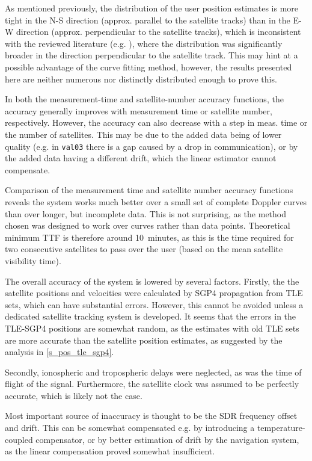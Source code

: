 As mentioned previously, the distribution of the user position estimates is more tight in the N-S direction (approx. parallel to the satellite tracks) than in the E-W direction (approx. perpendicular to the satellite tracks), which is inconsistent with the reviewed literature (e.g. \cite{sop10, sop12}), where the distribution was significantly broader in the direction perpendicular to the satellite track. This may hint at a possible advantage of the curve fitting method, however, the results presented here are neither numerous nor distinctly distributed enough to prove this.

In both the measurement-time and satellite-number accuracy functions, the accuracy generally improves with measurement time or satellite number, respectively. However, the accuracy can also decrease with a step in meas. time or the number of satellites. This may be due to the added data being of lower quality (e.g. in \texttt{val03} there is a gap caused by a drop in communication), or by the added data having a different drift, which the linear estimator cannot compensate.

Comparison of the measurement time and satellite number accuracy functions reveals the system works much better over a small set of complete Doppler curves than over longer, but incomplete data. This is not surprising, as the method chosen was designed to work over curves rather than data points. Theoretical minimum TTF is therefore around \qty{10}{minutes}, as this is the time required for two consecutive satellites to pass over the user (based on the mean satellite visibility time).

The overall accuracy of the system is lowered by several factors. Firstly, the the satellite positions and velocities were calculated by SGP4 propagation from TLE sets, which can have substantial errors. However, this cannot be avoided unless a dedicated satellite tracking system is developed. It seems that the errors in the TLE-SGP4 positions are somewhat random, as the estimates with old TLE sets are more accurate than the satellite position estimates, as suggested by the analysis in \autoref{s_pos_tle_sgp4}.

Secondly, ionospheric and tropospheric delays were neglected, as was the time of flight of the signal. Furthermore, the satellite clock was assumed to be perfectly accurate, which is likely not the case.

Most important source of inaccuracy is thought to be the SDR frequency offset and drift. This can be somewhat compensated e.g. by introducing a temperature-coupled compensator, or by better estimation of drift by the navigation system, as the linear compensation proved somewhat insufficient.



